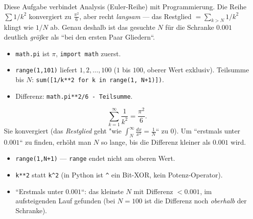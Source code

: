 


Diese Aufgabe verbindet Analysis (Euler-Reihe) mit Programmierung. Die
Reihe $\sum 1/k^2$ konvergiert zu $\frac{\pi^2}6$, aber recht \emph{langsam}
--- das Restglied $=\sum_{k>N}1/k^2$ klingt wie $1/N$ ab. Genau deshalb ist
das gesuchte $N$ f\"ur die Schranke $0.001$ deutlich \emph{gr\"o\ss}er als
``bei den ersten Paar Gliedern``.

\begin{werkzeugkasten}
\begin{itemize}
  \item \texttt{math.pi} ist $\pi$, \texttt{import math} zuerst.
  \item \texttt{range(1,101)} liefert $1,2,\dots,100$ ($1$ bis $100$,
        oberer Wert exklusiv). Teilsumme bis $N$:
        \texttt{sum([1/k**2 for k in range(1, N+1)])}.
  \item Differenz: \texttt{math.pi**2/6 - Teilsumme}.
\end{itemize}
\end{werkzeugkasten}

\begin{werkzeugkasten}
\begin{equation}
  \sum_{k=1}^{\infty}\frac1{k^2}=\frac{\pi^2}6 .
\end{equation}
Sie konvergiert (das \emph{Restglied} geht "wie $\int_N^\infty
\frac{dx}{x^2}=\frac1N$`` zu $0$). Um ``erstmals unter $0.001$`` zu
finden, erh\"oht man $N$ so lange, bis die Differenz kleiner als
$0.001$ wird.
\end{werkzeugkasten}

\begin{achtung}
\begin{itemize}
  \item \texttt{range(1,N+1)} --- \texttt{range} endet nicht am oberen
        Wert.
  \item \texttt{k**2} statt \verb|k^2| (in Python ist \verb|^| ein
        Bit-XOR, kein Potenz-Operator).
  \item ``Erstmals unter $0.001$``: das kleinste $N$ mit Differenz
        $<0.001$, im aufsteigenden Lauf gefunden (bei $N=100$ ist die
        Differenz noch \emph{oberhalb} der Schranke).
\end{itemize}
\end{achtung}
